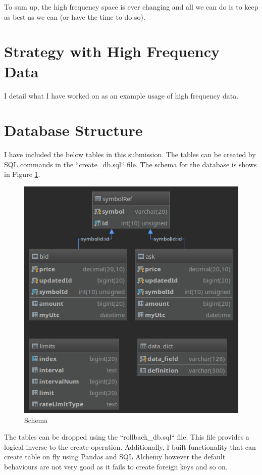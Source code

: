 \documentclass[12pt]{article}
\begin{document}
To sum up, the high frequency space is ever changing and all we can do is to keep as best as we can (or have the time to do so).

\section*{Strategy with High Frequency Data}
I detail what I have worked on as an example usage of high frequency data.
\section*{Database Structure}
I have included the below tables in this submission. The tables can be created by SQL commands in the ``create\_db.sql`` file. The schema for the database is shows in Figure \ref{fig:schema}.\\
\begin{figure}[h!]
  \centering
  \includegraphics[scale=0.40]{schema.png}
  \caption{Schema}
  \label{fig:schema}
\end{figure}

The tables can be dropped using the ``rollback\_db.sql`` file. This file provides a logical inverse to the create operation. Additionally, I built functionality that can create table on fly using Pandas and SQL Alchemy however the default behaviours are not very good as it fails to create foreign keys and so on.
\end{document}
